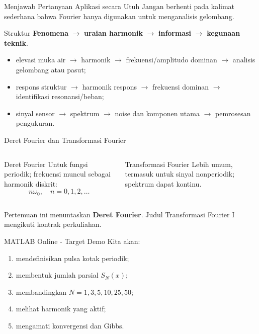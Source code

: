 \documentclass[aspectratio=169,10pt]{beamer}
\begin{document}
\begin{frame}{Menjawab Pertanyaan Aplikasi secara Utuh}
Jangan berhenti pada kalimat sederhana bahwa Fourier hanya digunakan untuk menganalisis gelombang.
\begin{block}{Struktur}
\textbf{Fenomena} $\rightarrow$ \textbf{uraian harmonik} $\rightarrow$ \textbf{informasi} $\rightarrow$ \textbf{kegunaan teknik}.
\end{block}
\begin{itemize}
\item elevasi muka air $\rightarrow$ harmonik $\rightarrow$ frekuensi/amplitudo dominan $\rightarrow$ analisis gelombang atau pasut;
\item respons struktur $\rightarrow$ harmonik respons $\rightarrow$ frekuensi dominan $\rightarrow$ identifikasi resonansi/beban;
\item sinyal sensor $\rightarrow$ spektrum $\rightarrow$ noise dan komponen utama $\rightarrow$ pemrosesan pengukuran.
\end{itemize}
\end{frame}


\begin{frame}{Deret Fourier dan Transformasi Fourier}
\begin{columns}[T]
\begin{block}{Deret Fourier}
Untuk fungsi periodik; frekuensi muncul sebagai harmonik diskrit:
\[
n\omega_0,\quad n=0,1,2,\ldots
\]
\end{block}
\begin{block}{Transformasi Fourier}
Lebih umum, termasuk untuk sinyal nonperiodik; spektrum dapat kontinu.
\end{block}
\end{columns}
\vspace{2mm}
Pertemuan ini menuntaskan \textbf{Deret Fourier}. Judul Transformasi Fourier I mengikuti kontrak perkuliahan.
\end{frame}


\begin{frame}{MATLAB Online - Target Demo}
Kita akan:
\begin{enumerate}
\item mendefinisikan pulsa kotak periodik;
\item membentuk jumlah parsial $S_N(x)$;
\item membandingkan $N=1,3,5,10,25,50$;
\item melihat harmonik yang aktif;
\item mengamati konvergensi dan Gibbs.
\end{enumerate}
\end{frame}
\end{document}
